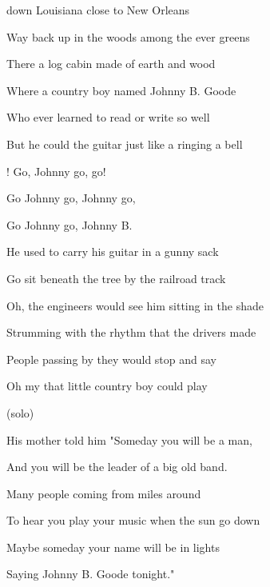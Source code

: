 
\zs
{} down Louisiana close to New   Orleans

Way back up in the woods among the ever  greens

There  a log cabin made of earth and wood

Where  a country boy named Johnny B. Goode

Who  ever learned to read or write so well

But he could  the guitar just like a ringing a bell
\ks

\zr
{}! Go, Johnny go, go!

Go Johnny go,  Johnny go, 

Go Johnny go,  Johnny B. 
\kr

\zs
He used to carry his guitar in a gunny sack

Go sit beneath the tree by the railroad track

Oh, the engineers would see him sitting in the shade

Strumming with the rhythm that the drivers made

People passing by they would stop and say

Oh my that little country boy could play
\ks

\zr\kr

\zs (solo) \ks 

\zs
His mother told him "Someday you will be a  man,

And you will be the leader of a big old band.

Many people coming from miles around

To hear you play your music when the sun go down

Maybe someday your name will be in lights

Saying Johnny B. Goode tonight."
\ks

\zr\kr
\kp
